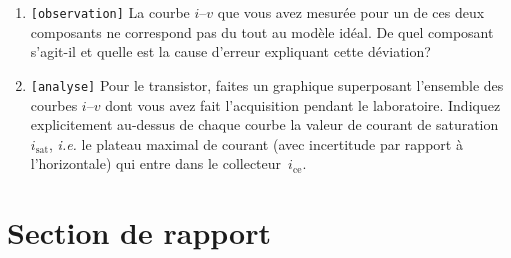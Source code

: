 \documentclass[canadien,12pt,oneside,letterpaper]{article}
\begin{document}
\begin{enumerate}[resume]
    \item \texttt{[observation]} La courbe $i$--$v$ que vous avez mesurée pour un de ces deux composants ne correspond pas du tout au modèle idéal. De quel composant s'agit-il et quelle est la cause d'erreur expliquant cette déviation?
    \item \texttt{[analyse]} Pour le transistor, faites un graphique superposant l'ensemble des courbes $i$--$v$ dont vous avez fait l'acquisition pendant le laboratoire. Indiquez explicitement au-dessus de chaque courbe la valeur de courant de saturation~$i_{\mathrm{sat}}$, \textit{i.e.} le plateau maximal de courant (avec incertitude par rapport à l'horizontale) qui entre dans le collecteur~$i_{\mathrm{ce}}$.
\end{enumerate}

\section{Section de rapport}
\end{document}
